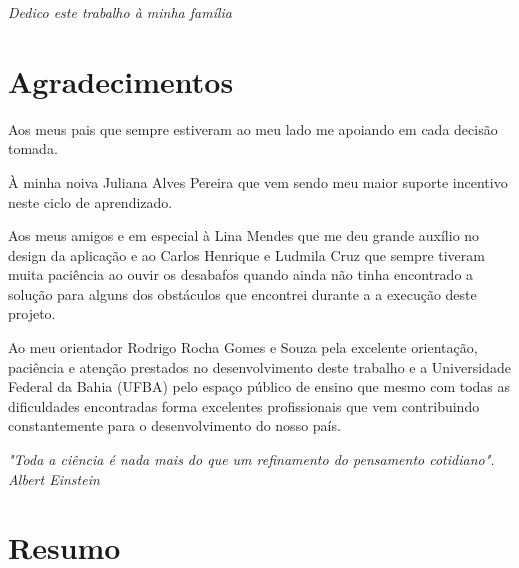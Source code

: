 \documentclass[12pt, a4paper]{report}
\begin{document}
\newpage
\vspace*{21cm}
\begin{flushright}
\textit{Dedico este trabalho à minha família}
\end{flushright}


\newpage
\chapter*{Agradecimentos}
\thispagestyle{empty}
\par Aos meus pais que sempre estiveram ao meu lado me apoiando em cada decisão tomada.

À minha noiva Juliana Alves Pereira que vem sendo meu maior suporte incentivo neste ciclo de aprendizado. 

Aos meus amigos e em especial à Lina Mendes que me deu grande auxílio no design da aplicação e ao Carlos Henrique e Ludmila Cruz que sempre tiveram muita paciência ao ouvir os desabafos quando ainda não tinha encontrado a solução para alguns dos obstáculos que encontrei durante a a execução deste projeto. 

Ao meu orientador Rodrigo Rocha Gomes e Souza pela excelente orientação, paciência e atenção prestados no desenvolvimento deste trabalho e a Universidade Federal da Bahia (UFBA) pelo espaço público de ensino que mesmo com todas as dificuldades encontradas forma excelentes profissionais que vem contribuindo constantemente para o desenvolvimento do nosso país.  

\newpage
\vspace*{20cm}
\begin{flushright}
\begin{minipage}{8cm}
\begin{flushright}
\textit{
"Toda a ciência é nada mais do que um refinamento do pensamento cotidiano". \\
Albert Einstein}
\end{flushright}
\end{minipage}
\end{flushright}


\newpage
\chapter*{Resumo}
\thispagestyle{empty}


\newpage
\end{document}
